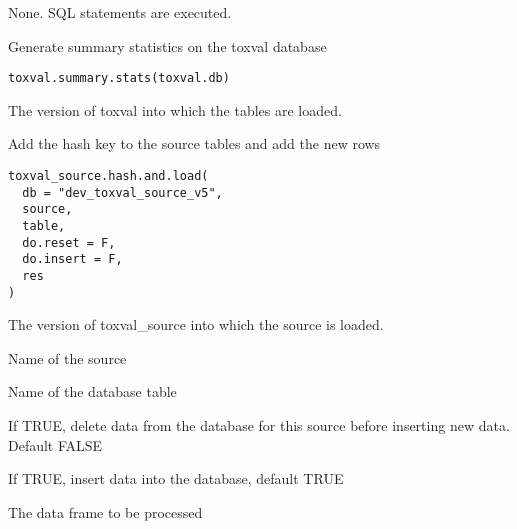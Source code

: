 \documentclass[letterpaper]{book}
\begin{document}
%
\begin{Value}
None. SQL statements are executed.
\end{Value}
%
\begin{Description}\relax
Generate summary statistics on the toxval database
\end{Description}
%
\begin{Usage}
\begin{verbatim}
toxval.summary.stats(toxval.db)
\end{verbatim}
\end{Usage}
%
\begin{Arguments}
\begin{ldescription}
\item[\code{toxval.db}] The version of toxval into which the tables are loaded.
\end{ldescription}
\end{Arguments}
%
\begin{Description}\relax
Add the hash key to the source tables and add the new rows
\end{Description}
%
\begin{Usage}
\begin{verbatim}
toxval_source.hash.and.load(
  db = "dev_toxval_source_v5",
  source,
  table,
  do.reset = F,
  do.insert = F,
  res
)
\end{verbatim}
\end{Usage}
%
\begin{Arguments}
\begin{ldescription}
\item[\code{db}] The version of toxval\_source into which the source is loaded.

\item[\code{source}] Name of the source

\item[\code{table}] Name of the database table

\item[\code{do.reset}] If TRUE, delete data from the database for this source before
inserting new data. Default FALSE

\item[\code{do.insert}] If TRUE, insert data into the database, default TRUE

\item[\code{res}] The data frame to be processed
\end{ldescription}
\end{Arguments}
\printindex{}
\end{document}
